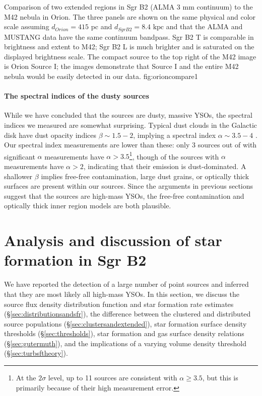 \documentclass[twocolumn]{aastex61}
\newcommand{\dsgrb}{\ensuremath{8.4\textrm{~kpc}}\xspace}
\begin{document}
{Comparison of two extended \hii regions in Sgr B2 (ALMA 3 mm continuum) to the
M42 \citep[GBT MUSTANG 3 mm continuum;][]{Dicker2009a} nebula in Orion.
The three panels are shown on the same physical and color scale assuming
$d_{Orion} = 415$ pc and $d_{Sgr B2} = $\dsgrb and that the ALMA and MUSTANG
data have the same continuum bandpass.  Sgr B2 \hii T is comparable in
brightness and extent to M42; Sgr B2 \hii L is much brighter and is saturated
on the displayed brightness scale.  The compact source to the top right of the
M42 image is Orion Source I; the images demonstrate that Source I and the entire
M42 nebula would be easily detected in our data.
}
{fig:orioncompare}{1}{\textwidth}

\paragraph{The spectral indices of the dusty sources}
While we have concluded that the sources are dusty, massive YSOs, the
spectral indices we measured are somewhat surprising.  Typical dust clouds in
the Galactic disk have dust opacity indices $\beta\sim1.5-2$, implying 
a spectral index $\alpha\sim3.5-4$
\citep[$\beta=\alpha-2$;][]{Schnee2010a,Shirley2011a,Sadavoy2016a}.  Our spectral index measurements
are lower
than these:  only 3 sources out of \nalphas with significant $\alpha$
measurements have $\alpha > 3.5$\footnote{At the
$2\sigma$ level, up to 11 sources are consistent with $\alpha\geq3.5$, but this is
primarily because of their high measurement error.}, though \ngttwo of the
sources with $\alpha$ measurements have $\alpha>2$, indicating that their
emission is dust-dominated.  A shallower $\beta$ implies free-free
contamination, large dust grains, or optically thick surfaces are present
within our sources.  Since the arguments in previous sections suggest that the
sources are high-mass YSOs, the free-free contamination and optically thick
inner region models are both plausible.

\section{Analysis and discussion of star formation in Sgr B2}
\label{sec:sfdiscussion}

We have reported the detection of a large number of point sources and inferred
that they are most likely all high-mass YSOs.  In this section,
we discuss
the source flux density distribution function and star formation rate estimates
(\S \ref{sec:distributionsandsfr}), the difference between the clustered and
distributed source populations (\S \ref{sec:clustersandextended}), star
formation surface density thresholds (\S \ref{sec:thresholds}), star formation
and gas surface density relations (\S \ref{sec:gutermuth}), and the
implications of a varying volume density threshold (\S \ref{sec:turbsftheory}).
\end{document}
